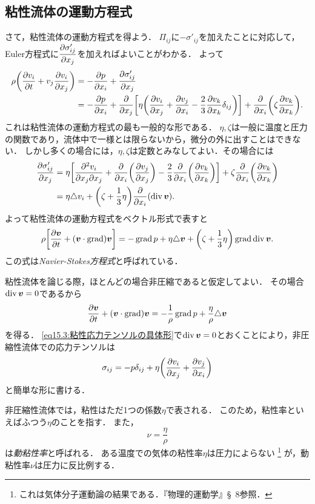 \subsection*{粘性流体の運動方程式}
さて，粘性流体の運動方程式を得よう．
$\varPi_{ij}$に$-\sigma'_{ij}$を加えたことに対応して，Euler方程式に$\dpdv{\sigma'_{ij}}{x_j}$を加えればよいことがわかる．
よって
\begin{align}
    \rho \pqty{ \pdv{v_i}{t} + v_j \pdv{v_i}{x_j} } &= - \pdv{p}{x_i} + \pdv{\sigma'_{ij}}{x_j} \notag \\
    &= - \pdv{p}{x_i} + \pdv{x_j} \bqty{ \eta \pqty{ \pdv{v_i}{x_j} + \pdv{v_j}{x_i} - \frac{2}{3}\pdv{v_k}{x_k} \delta_{ij} } } + \pdv{x_i} \pqty{ \zeta \pdv{v_k}{x_k} }.
\end{align}
これは粘性流体の運動方程式の最も一般的な形である．
$\eta,\zeta$は一般に温度と圧力の関数であり，流体中で一様とは限らないから，微分の外に出すことはできない．
しかし多くの場合には，$\eta,\zeta$は定数とみなしてよい．その場合には
\begin{align*}
    \pdv{\sigma'_{ij}}{x_j} &= \eta \bqty{ \pdv{v_i}{x_j}{x_j} + \pdv{x_i} \pqty{\pdv{v_j}{x_j}} - \frac{2}{3}\pdv{x_i} \pqty{\pdv{v_k}{x_k}} } + \zeta \pdv{x_i} \pqty{\pdv{v_k}{x_k}} \\
    &= \eta \Laplacian v_i + \pqty{\zeta+\frac{1}{3}\eta} \pdv{x_i} (\Div\v) .
\end{align*}
よって粘性流体の運動方程式をベクトル形式で表すと
\begin{equation}
    \rho \bqty{ \pdv{\v}{t} + (\v\cdot\Grad)\v } = -\Grad p + \eta\Laplacian\v + \pqty{\zeta+\frac{1}{3}\eta} \Grad \Div\v .
\end{equation}
この式は\emph{Navier-Stokes方程式}と呼ばれている．


粘性流体を論じる際，ほとんどの場合非圧縮であると仮定してよい．
その場合$\operatorname{div}\vb*{v}=0$であるから
\begin{equation}\label{eq15.7:非圧縮性流体のNS方程式}
    \pdv{\vb*{v}}{t} + (\vb*{v}\cdot\operatorname{grad})\vb*{v}  = - \frac{1}{\rho}\operatorname{grad} p + \frac{\eta}{\rho} \triangle\vb*{v} 
\end{equation}
を得る．
\eqref{eq15.3:粘性応力テンソルの具体形}で$\operatorname{div}\vb*{v}=0$とおくことにより，非圧縮性流体での応力テンソルは
\begin{equation}\label{eq15.8:非圧縮性流体での応力テンソル}
    \sigma_{ij} = -p \delta_{ij} + \eta \pqty{ \pdv{v_i}{x_j} + \pdv{v_j}{x_i} }
\end{equation}
と簡単な形に書ける．


非圧縮性流体では，粘性はただ1つの係数$\eta$で表される．
このため，粘性率といえばふつう$\eta$のことを指す．
また，
\begin{equation}
    \nu = \frac{\eta}{\rho}
\end{equation}
は\emph{動粘性率}と呼ばれる．
ある温度での気体の粘性率$\eta$は圧力によらない
\footnote{これは気体分子運動論の結果である．『物理的運動学』\S~8参照．}
が，動粘性率$\nu$は圧力に反比例する．




